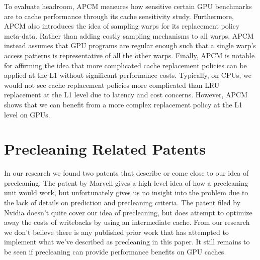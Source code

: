 To evaluate headroom, APCM measures how sensitive certain GPU benchmarks are to cache performance through its cache sensitivity study. Furthermore, APCM also introduces the idea of sampling warps for its replacement policy meta-data. Rather than adding costly sampling mechanisms to all warps, APCM instead assumes that GPU programs are regular enough such that a single warp's access patterns is representative of all the other warps. Finally, APCM is notable for affirming the idea that more complicated cache replacement policies can be applied at the L1 without significant performance costs. Typically, on CPUs, we would not see cache replacement policies more complicated than LRU replacement at the L1 level due to latency and cost concerns. However, APCM shows that we can benefit from a more complex replacement policy at the L1 level on GPUs.

\section{Precleaning Related Patents}
In our research we found two patents that describe or come close to our idea of precleaning. The patent by Marvell \cite{preclean_cpu} gives a high level idea of how a precleaning unit would work, but unfortunately gives us no insight into the problem due to the lack of details on prediction and precleaning criteria. The patent filed by Nvidia \cite{preclean_nvidia_patent} doesn't quite cover our idea of precleaning, but does attempt to optimize away the costs of writebacks by using an intermediate cache. From our research we don't believe there is any published prior work that has attempted to implement what we've described as precleaning in this paper. It still remains to be seen if precleaning can provide performance benefits on GPU caches.
